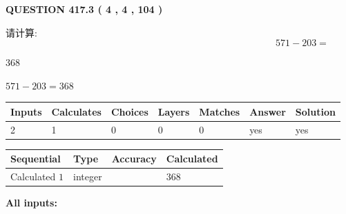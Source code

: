 \documentclass{ctexart}
\begin{document}
{\textbf{\Large{QUESTION
417.3 
 ( 4 , 4 , 104 )
}}}
  
  
 
请计算:
\begin{equation}
571 -   %
203 = \nonumber
\end{equation}
 
 
 
\noindent{}
 
 

368
 
 
\noindent{}
 
 

 
 
 
\noindent{}
 
 

$ %
571 -  %
203=   %
368$
 
 
\noindent{}
 
 

 
   
   
   
   
\noindent\begin{tabular}{|l|l|l|l|l|l|l|}
 \hline
Inputs & Calculates & Choices & Layers & Matches & Answer & Solution \\ \hline
 2  & 
 1  & 
 0
  & 
 0  & 
 0  & 
  yes & 
  yes 
  \\ \hline
 \end{tabular}
   
   
   
   
\noindent{}
   
   
  
  
\noindent\begin{tabular}{|l|l|l|l|}
\hline
 Sequential & Type & Accuracy & Calculated \\ 
\hline
 
 
  Calculated $  1 $ & integer &  & 
  $ 368 $ 
 \\  \hline  
 \end{tabular}
   
   
   
   
\noindent\vspace{0.1in}\hspace{-0.08in} {\textbf{\Large{All inputs: }}}
   
\end{document}

